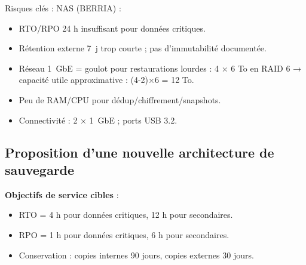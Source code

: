 \noindent Risques clés : NAS (BERRIA) :
\begin{itemize}
	\item RTO/RPO 24 h insuffisant pour données critiques.
	\item Rétention externe 7~j trop courte ; pas d'immutabilité documentée.
	\item Réseau 1~GbE = goulot pour restaurations lourdes : 4 × 6 To en RAID 6 → capacité utile approximative : (4-2)×6 = 12 To.
	\item Peu de RAM/CPU pour dédup/chiffrement/snapshots.
	\item Connectivité : 2 × 1~GbE ; ports USB 3.2.
\end{itemize}

\subsection*{Proposition d'une nouvelle architecture de sauvegarde}
{}

\noindent \textbf{Objectifs de service cibles} :
\begin{itemize}
	\item RTO = 4 h pour données critiques, 12 h pour secondaires.
	\item RPO = 1 h pour données critiques, 6 h pour secondaires.
	\item Conservation : copies internes 90 jours, copies externes 30 jours.
\end{itemize}

\vspace{0.5cm}

